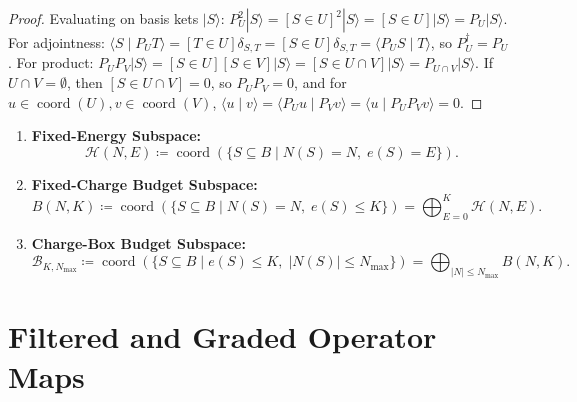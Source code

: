 \begin{proof}
Evaluating on basis kets $|S\rangle$:
$P_U^2 |S\rangle = [S \in U]^2 |S\rangle = [S \in U] |S\rangle = P_U |S\rangle$.
For adjointness: $\langle S \mid P_U T \rangle = [T \in U] \delta_{S, T} = [S \in U] \delta_{S, T} = \langle P_U S \mid T \rangle$, so $P_U^\dagger = P_U$.
For product: $P_U P_V |S\rangle = [S \in U][S \in V] |S\rangle = [S \in U \cap V] |S\rangle = P_{U \cap V} |S\rangle$.
If $U \cap V = \emptyset$, then $[S \in U \cap V] = 0$, so $P_U P_V = 0$, and for $u \in \operatorname{coord}(U), v \in \operatorname{coord}(V)$, $\langle u \mid v \rangle = \langle P_U u \mid P_V v \rangle = \langle u \mid P_U P_V v \rangle = 0$.
\end{proof}

\begin{definition}
\begin{enumerate}
    \item \textbf{Fixed-Energy Subspace:}
    \begin{equation}
    \mathcal{H}(N, E) \coloneqq \operatorname{coord}\left( \{S \subseteq B \mid N(S) = N,\; e(S) = E\} \right).
    \end{equation}
    \item \textbf{Fixed-Charge Budget Subspace:}
    \begin{equation}
    B(N, K) \coloneqq \operatorname{coord}\left( \{S \subseteq B \mid N(S) = N,\; e(S) \le K\} \right) = \bigoplus_{E=0}^K \mathcal{H}(N, E).
    \end{equation}
    \item \textbf{Charge-Box Budget Subspace:}
    \begin{equation}
    \mathcal{B}_{K, N_{\max}} \coloneqq \operatorname{coord}\left( \{S \subseteq B \mid e(S) \le K,\; |N(S)| \le N_{\max}\} \right) = \bigoplus_{|N| \le N_{\max}} B(N, K).
    \end{equation}
\end{enumerate}
\end{definition}

\section{Filtered and Graded Operator Maps}


